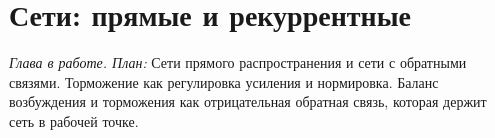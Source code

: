 \chapter{Сети: прямые и рекуррентные}
\label{sec:circuits}

\emph{Глава в работе. План:} Сети прямого распространения и сети с обратными связями. Торможение как регулировка усиления и нормировка. Баланс возбуждения и торможения как отрицательная обратная связь, которая держит сеть в рабочей точке.
